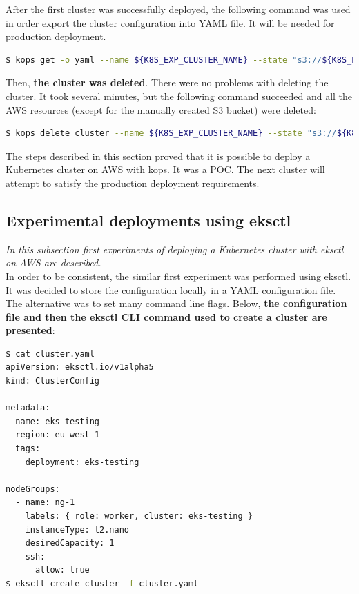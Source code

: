 After the first cluster was successfully deployed, the following command was used in order export the cluster configuration into YAML file. It will be needed for production deployment.
\begin{lstlisting}[basicstyle=\tiny,caption={Command used to export a Kubernetes cluster configuration},captionpos=b,language=Bash,xleftmargin=1cm]
$ kops get -o yaml --name ${K8S_EXP_CLUSTER_NAME} --state "s3://${K8S_EXP_KOPS_S3_BUCKET}"
\end{lstlisting}

Then, \textbf{the cluster was deleted}. There were no problems with deleting the cluster. It took several minutes, but the following command succeeded and all the AWS resources (except for the manually created S3 bucket) were deleted:

\begin{lstlisting}[basicstyle=\tiny,caption={Command used to delete a Kubernetes cluster created with Kops},captionpos=b,language=Bash,xleftmargin=1cm]
$ kops delete cluster --name ${K8S_EXP_CLUSTER_NAME} --state "s3://${K8S_EXP_KOPS_S3_BUCKET}" --yes
\end{lstlisting}

The steps described in this section proved that it is possible to deploy a Kubernetes cluster on AWS with kops. It was a POC. The next cluster will attempt to satisfy the production deployment requirements.

\subsection{Experimental deployments using eksctl}
\textit{In this subsection first experiments of deploying a Kubernetes cluster with eksctl on AWS are described.}
\\

In order to be consistent, the similar first experiment was performed using eksctl. It was decided to store the configuration locally in a YAML configuration file. The alternative was to set many command line flags. Below, \textbf{the configuration file and then the eksctl CLI command used to create a cluster are presented}:
\begin{lstlisting}[basicstyle=\tiny,caption={Commands used to create a cluster with eksctl, without prerequisite steps performed},captionpos=b,language=Bash,xleftmargin=1cm]
$ cat cluster.yaml
apiVersion: eksctl.io/v1alpha5
kind: ClusterConfig

metadata:
  name: eks-testing
  region: eu-west-1
  tags:
    deployment: eks-testing

nodeGroups:
  - name: ng-1
    labels: { role: worker, cluster: eks-testing }
    instanceType: t2.nano
    desiredCapacity: 1
    ssh:
      allow: true
$ eksctl create cluster -f cluster.yaml
\end{lstlisting}


